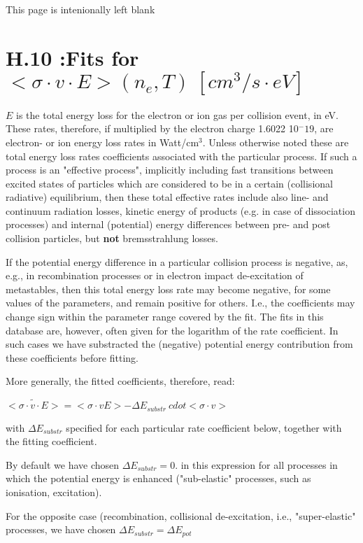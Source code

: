 \documentclass[12pt]{article}
\begin{document}
\newpage
This page is intenionally left blank
\newpage
\section{H.10 :Fits for $<\sigma \cdot v \cdot E> (n_e,T) \
[cm^3/s \cdot eV]$}

$E$ is the total energy loss for the electron or ion gas per collision event, 
in eV.
These rates, therefore, if multiplied by the electron charge 1.6022 10$^-19$,
are electron- or ion energy loss rates in Watt/cm$^3$. 
Unless otherwise noted
these are total energy loss rates coefficients associated 
with the particular process.
If such a process is an "effective process", 
implicitly including fast transitions between excited
states of particles which are considered to be in a certain 
(collisional radiative) equilibrium,
then these total effective rates include also line- and continuum 
radiation losses, kinetic energy of
products (e.g. in case of dissociation processes) and 
internal (potential) energy
differences between pre- and post collision particles,
but {\bf not} bremsstrahlung losses.

If the potential energy difference in a particular collision process
is negative, as, e.g., in recombination processes
or in electron impact de-excitation of metastables, 
then this total energy loss rate
may become negative, for some values of the parameters, 
and remain positive for others.
I.e., the coefficients may change sign within the parameter 
range covered by the fit.
The fits in this database are, however, often given for the logarithm of the
rate coefficient. In such cases we have substracted the (negative) potential energy
contribution from these coefficients before fitting.

More generally, the fitted coefficients, therefore, read:

$\tilde{<\sigma \cdot v \cdot E>} = <\sigma \cdot v E> - \Delta E_{substr} \ cdot <\sigma \cdot v>$

with $\Delta E_{substr} $ specified for each particular rate coefficient below, together
with the fitting coefficient.

By default we have chosen $\Delta E_{substr} = 0.$ in this expression
for all processes in which the potential energy is
enhanced ("sub-elastic" processes, such as ionisation, excitation).

For the opposite case (recombination, collisional de-excitation, i.e., "super-elastic"
processes, we have chosen $\Delta E_{substr} = \Delta E_{pot}$
\end{document}
